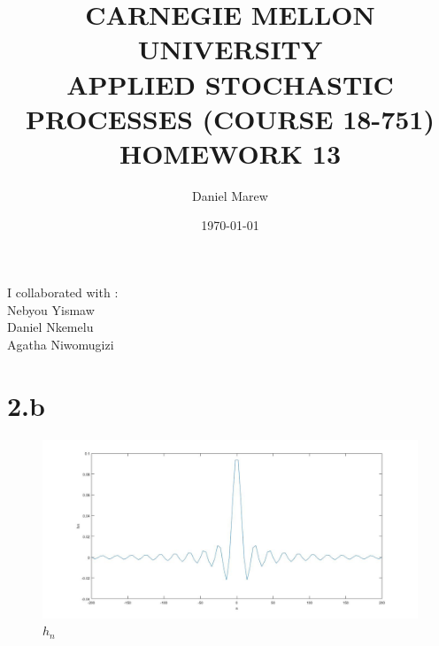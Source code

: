 \documentclass[a4paper,11pt]{article}
\begin{document}
\title{\color{red}CARNEGIE MELLON UNIVERSITY\\
APPLIED STOCHASTIC PROCESSES  (COURSE 18-751)\\
HOMEWORK 13}
\author{Daniel Marew}
\date{\today}
\clearpage\maketitle

\thispagestyle{empty}
\newpage
I collaborated with :\\
\hspace*{6cm}
Nebyou Yismaw\\
\hspace*{6cm}
Daniel    Nkemelu\\
\hspace*{6cm}
Agatha Niwomugizi
\thispagestyle{empty}
\newpage
\clearpage
\setcounter{page}{1}
\section*{2.b}
\begin{figure}[h]
  \hspace*{-5cm}
   \includegraphics[scale=0.45]{q2_b_1}
   \caption{$h_n$}\label{fig:q3}
\end{figure}
\end{document}
